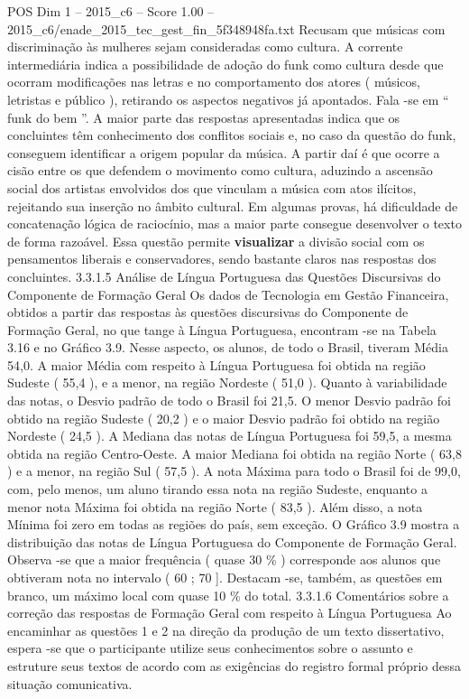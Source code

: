 \begin{textsample}{POS Dim 1 – 2015\_c6 – Score 1.00 – 2015\_c6/enade\_2015\_tec\_gest\_fin\_5f348948fa.txt}
Recusam que músicas com discriminação às mulheres sejam consideradas como cultura.
A corrente intermediária indica a possibilidade de adoção do funk como cultura desde que ocorram modificações nas letras e no comportamento dos atores ( músicos, letristas e público ), retirando os aspectos negativos já apontados.
Fala -se em “ funk do bem ”.
A maior parte das respostas apresentadas indica que os concluintes têm conhecimento dos conflitos sociais e, no caso da questão do funk, conseguem identificar a origem popular da música.
A partir daí é que ocorre a cisão entre os que defendem o movimento como cultura, aduzindo a ascensão social dos artistas envolvidos dos que vinculam a música com atos ilícitos, rejeitando sua inserção no âmbito cultural.
Em algumas provas, há dificuldade de concatenação lógica de raciocínio, mas a maior parte consegue desenvolver o texto de forma razoável.
Essa questão permite \textbf{visualizar} a divisão social com os pensamentos liberais e conservadores, sendo bastante claros nas respostas dos concluintes. 3.3.1.5 Análise de Língua Portuguesa das Questões Discursivas do Componente de Formação Geral Os dados de Tecnologia em Gestão Financeira, obtidos a partir das respostas às questões discursivas do Componente de Formação Geral, no que tange à Língua Portuguesa, encontram -se na Tabela 3.16 e no Gráfico 3.9.
Nesse aspecto, os alunos, de todo o Brasil, tiveram Média 54,0.
A maior Média com respeito à Língua Portuguesa foi obtida na região Sudeste ( 55,4 ), e a menor, na região Nordeste ( 51,0 ).
Quanto à variabilidade das notas, o Desvio padrão de todo o Brasil foi 21,5.
O menor Desvio padrão foi obtido na região Sudeste ( 20,2 ) e o maior Desvio padrão foi obtido na região Nordeste ( 24,5 ).
A Mediana das notas de Língua Portuguesa foi 59,5, a mesma obtida na região Centro-Oeste.
A maior Mediana foi obtida na região Norte ( 63,8 ) e a menor, na região Sul ( 57,5 ).
A nota Máxima para todo o Brasil foi de 99,0, com, pelo menos, um aluno tirando essa nota na região Sudeste, enquanto a menor nota Máxima foi obtida na região Norte ( 83,5 ).
Além disso, a nota Mínima foi zero em todas as regiões do país, sem exceção.
O Gráfico 3.9 mostra a distribuição das notas de Língua Portuguesa do Componente de Formação Geral.
Observa -se que a maior frequência ( quase 30 \% ) corresponde aos alunos que obtiveram nota no intervalo ( 60 ; 70 ].
Destacam -se, também, as questões em branco, um máximo local com quase 10 \% do total. 3.3.1.6 Comentários sobre a correção das respostas de Formação Geral com respeito à Língua Portuguesa Ao encaminhar as questões 1 e 2 na direção da produção de um texto dissertativo, espera -se que o participante utilize seus conhecimentos sobre o assunto e estruture seus textos de acordo com as exigências do registro formal próprio dessa situação comunicativa.

\end{textsample}
